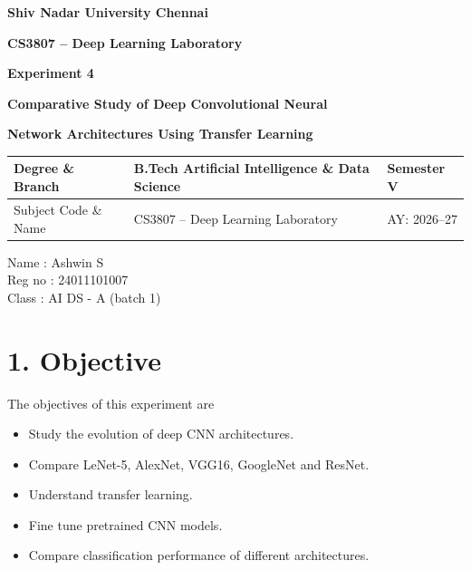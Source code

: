 \documentclass[11pt]{article}
\begin{document}

\begin{center}

{\Large\textbf{Shiv Nadar University Chennai}}

\vspace{3mm}

{\large\textbf{CS3807 -- Deep Learning Laboratory}}

\vspace{3mm}

{\Large\textbf{Experiment 4}}

\vspace{2mm}

{\Large\textbf{Comparative Study of Deep Convolutional Neural}}

{\Large\textbf{Network Architectures Using Transfer Learning}}

\end{center}

\vspace{5mm}

\begin{tabular}{|p{4cm}|p{8cm}|p{2cm}|}
\hline
Degree \& Branch &
B.Tech Artificial Intelligence \& Data Science &
Semester V\\
\hline
Subject Code \& Name &
CS3807 -- Deep Learning Laboratory &
AY: 2026--27\\
\hline
\end{tabular}

\vspace{4mm}
Name : Ashwin S\\
Reg no : 24011101007\\
Class : AI DS - A (batch 1)\\


\section*{1. Objective}

The objectives of this experiment are

\begin{itemize}

\item Study the evolution of deep CNN architectures.

\item Compare LeNet-5, AlexNet, VGG16, GoogleNet and ResNet.

\item Understand transfer learning.

\item Fine tune pretrained CNN models.

\item Compare classification performance of different architectures.

\end{itemize}
\end{document}
